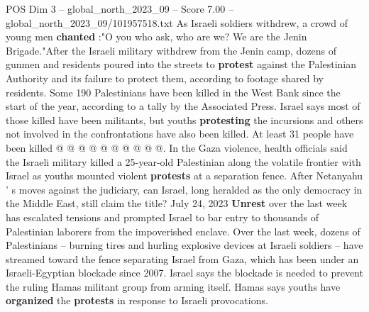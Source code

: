 \begin{textsample}{POS Dim 3 – global\_north\_2023\_09 – Score 7.00 – global\_north\_2023\_09/101957518.txt}
As Israeli soldiers withdrew, a crowd of young men \textbf{chanted} :"O you who ask, who are we?
We are the Jenin Brigade."After the Israeli military withdrew from the Jenin camp, dozens of gunmen and residents poured into the streets to \textbf{protest} against the Palestinian Authority and its failure to protect them, according to footage shared by residents.
Some 190 Palestinians have been killed in the West Bank since the start of the year, according to a tally by the Associated Press.
Israel says most of those killed have been militants, but youths \textbf{protesting} the incursions and others not involved in the confrontations have also been killed.
At least 31 people have been killed @ @ @ @ @ @ @ @ @ @.
In the Gaza violence, health officials said the Israeli military killed a 25-year-old Palestinian along the volatile frontier with Israel as youths mounted violent \textbf{protests} at a separation fence.
After Netanyahu ' s moves against the judiciary, can Israel, long heralded as the only democracy in the Middle East, still claim the title?
July 24, 2023 \textbf{Unrest} over the last week has escalated tensions and prompted Israel to bar entry to thousands of Palestinian laborers from the impoverished enclave.
Over the last week, dozens of Palestinians -- burning tires and hurling explosive devices at Israeli soldiers -- have streamed toward the fence separating Israel from Gaza, which has been under an Israeli-Egyptian blockade since 2007.
Israel says the blockade is needed to prevent the ruling Hamas militant group from arming itself.
Hamas says youths have \textbf{organized} the \textbf{protests} in response to Israeli provocations.

\end{textsample}
